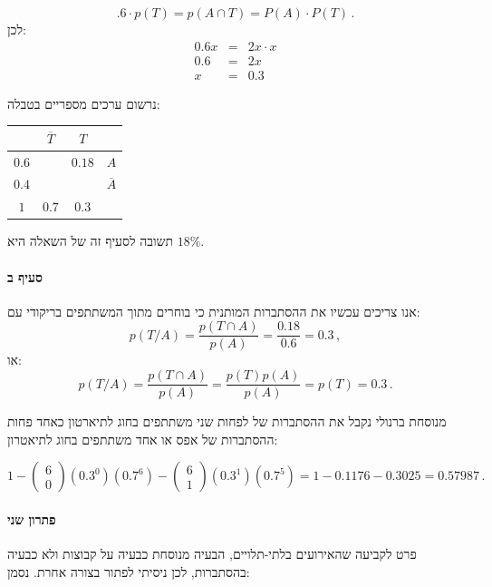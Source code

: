 \documentclass[12pt,a4paper]{article}
\begin{document}
\[
.6 \cdot p(T) = p(A\cap T) = P(A) \cdot P(T)\,.
\]
לכן:
\begin{eqnarray*}
0.6x &=& 2x \cdot x\\
0.6 &=& 2x\\
x &=& 0.3
\end{eqnarray*}

נרשום ערכים מספריים בטבלה:

\begin{center}
\renewcommand{\arraystretch}{1.2}
\setlength{\tabcolsep}{12pt}
\begin{tabular}{|c|c|c|c|}
\hline
&$\overline{T}$&$T$&\\\hline
$0.6$&&$0.18$&$A$\\\hline
$0.4$&&&$\overline{A}$\\\hline
$1$&$0.7$&$0.3$&\\\hline
\end{tabular}
\end{center}

תשובה לסעיף זה של השאלה היא
$18\%$.

\vspace{-1ex}\paragraph{סעיף ב}

אנו צריכים עכשיו את ההסתברות המותנית כי בוחרים מתוך המשתתפים בריקודי עם:
\[
p(T / A) = \frac{p(T\cap A)}{p(A)} = \frac{0.18}{0.6} = 0.3\,,
\]
או:
\[
p(T / A) = \frac{p(T\cap A)}{p(A)} = \frac{p(T)p(A)}{p(A)} = p(T) = 0.3\,.
\]

מנוסחת ברנולי נקבל את ההסתברות של לפחות שני משתתפים בחוג לתיארטון כאחד פחות ההסתברות של אפס או אחד משתתפים בחוג לתיאטרון:

\[
1 - \left(\begin{array}{c}6\\0\end{array}\right) (0.3^0) (0.7^6) - \left(\begin{array}{c}6\\1\end{array}\right) (0.3^1) (0.7^5) = 1-0.1176-0.3025 = 0.57987\,.
\]

\vspace{-1ex}\paragraph{פתרון שני}

פרט לקביעה שהאירועים בלתי-תלויים, הבעיה מנוסחת כבעיה על קבוצות ולא כבעיה בהסתברות, לכן ניסיתי לפתור בצורה אחרת. נסמן:
\end{document}
